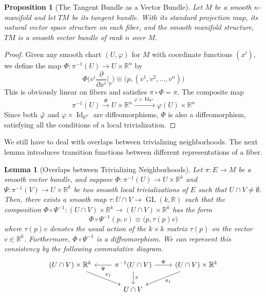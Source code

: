 \documentclass{article}
\DeclareMathOperator{\GL}{GL}
\DeclareMathOperator{\Id}{Id}
\newtheorem{proposition}[theorem]{Proposition}
\newtheorem{lemma}[theorem]{Lemma}
\theoremstyle{remark}
\theoremstyle{definition}
\begin{document}
\begin{proposition}[The Tangent Bundle as a Vector Bundle]
Let $M$ be a smooth $n$-manifold and let $TM$ be its tangent bundle. With its standard projection map, its natural vector space structure on each fiber, and the smooth manifold structure, $TM$ is a smooth vector bundle of rank $n$ over $M$. 
\end{proposition}
\begin{proof}
Given any smooth chart $(U, \varphi)$ for $M$ with coordinate functions $(x^i)$, we define the map $\Phi: \pi^{-1} (U) \longrightarrow U \times \mathbb{R}^n$ by 
\[\Phi \bigg( v^i \frac{\partial}{\partial x^i} \bigg|_p \bigg) \equiv \big( p, (v^1, v^2, ..., v^n)\big)\]
This is obviously linear on fibers and satisfies $\pi \circ \Phi = \pi$. The composite map 
\[\pi^{-1} (U) \xrightarrow{\Phi} U \times \mathbb{R}^n \xrightarrow{\varphi \times \Id_{\mathbb{R}^n}} \varphi(U) \times \mathbb{R}^n\]
Since both $\Tilde{\varphi}$ and $\varphi \times \Id_{\mathbb{R}^n}$ are diffeomorphisms, $\Phi$ is also a diffeomorphism, satisfying all the conditions of a local trivialization. 
\end{proof}

We still have to deal with overlaps between trivializing neighborhoods. The next lemma introduces transition functions between different representations of a fiber. 

\begin{lemma}[Overlaps between Trivializing Neighborhoods]
Let $\pi: E \longrightarrow M$ be a smooth vector bundle, and suppose $\Phi: \pi^{-1} (U) \longrightarrow U \times \mathbb{R}^k$ and $\Psi: \pi^{-1} (V) \longrightarrow U \times \mathbb{R}^k$ be two smooth local trivializations of $E$ such that $U \cap V \neq \emptyset$. Then, there exists a smooth map $\tau: U \cap V \longrightarrow \GL(k, \mathbb{R})$ such that the composition $\Phi \circ \Psi^{-1} : (U \cap V) \times \mathbb{R}^k \longrightarrow (U \cap V) \times \mathbb{R}^k$ has the form
\[\Phi \circ \Psi^{-1} (p, v) \equiv \big(p, \tau(p) v \big)\]
where $\tau(p) v$ denotes the usual action of the $k \times k$ matrix $\tau(p)$ on the vector $v \in \mathbb{R}^k$. Furthermore, $\Phi \circ \Psi^{-1}$ is a diffeomorphism. We can represent this consistency by the following commutative diagram. 
\[\begin{tikzcd}
(U \cap V) \times \mathbb{R}^k \arrow{dr}{\pi_1}& \pi^{-1} (U \cap V) \arrow{l}{\Psi} \arrow{r}{\Phi} \arrow{d}{\pi} & (U \cap V) \times \mathbb{R}^k \arrow{dl}{\pi_1}\\
& U \cap V & 
\end{tikzcd}\]
\end{lemma}
\end{document}
